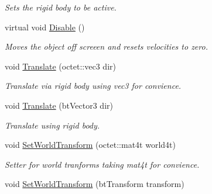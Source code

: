 \begin{DoxyCompactItemize}
\begin{DoxyCompactList}\small\item\em Sets the rigid body to be active. \end{DoxyCompactList}\item 
\hypertarget{class_arena_1_1_physics_object_a2fa9893c955d2332d67108fbaa7f308e}{virtual void \hyperlink{class_arena_1_1_physics_object_a2fa9893c955d2332d67108fbaa7f308e}{Disable} ()}\label{class_arena_1_1_physics_object_a2fa9893c955d2332d67108fbaa7f308e}

\begin{DoxyCompactList}\small\item\em Moves the object off screeen and resets velocities to zero. \end{DoxyCompactList}\item 
\hypertarget{class_arena_1_1_physics_object_a93fc76dcb805562b0a52bfd2cf5875fc}{void \hyperlink{class_arena_1_1_physics_object_a93fc76dcb805562b0a52bfd2cf5875fc}{Translate} (octet\+::vec3 dir)}\label{class_arena_1_1_physics_object_a93fc76dcb805562b0a52bfd2cf5875fc}

\begin{DoxyCompactList}\small\item\em Translate via rigid body using vec3 for convience. \end{DoxyCompactList}\item 
\hypertarget{class_arena_1_1_physics_object_a0f087630aa3ec68b5038c14e65ead3c5}{void \hyperlink{class_arena_1_1_physics_object_a0f087630aa3ec68b5038c14e65ead3c5}{Translate} (bt\+Vector3 dir)}\label{class_arena_1_1_physics_object_a0f087630aa3ec68b5038c14e65ead3c5}

\begin{DoxyCompactList}\small\item\em Translate using rigid body. \end{DoxyCompactList}\item 
\hypertarget{class_arena_1_1_physics_object_ab3f025024f294f67913cd06c2ee0116a}{void \hyperlink{class_arena_1_1_physics_object_ab3f025024f294f67913cd06c2ee0116a}{Set\+World\+Transform} (octet\+::mat4t world4t)}\label{class_arena_1_1_physics_object_ab3f025024f294f67913cd06c2ee0116a}

\begin{DoxyCompactList}\small\item\em Setter for world tranforms taking mat4t for convience. \end{DoxyCompactList}\item 
\hypertarget{class_arena_1_1_physics_object_a69f91c2a392a5ace0af86d69d355f5ee}{void \hyperlink{class_arena_1_1_physics_object_a69f91c2a392a5ace0af86d69d355f5ee}{Set\+World\+Transform} (bt\+Transform transform)}\label{class_arena_1_1_physics_object_a69f91c2a392a5ace0af86d69d355f5ee}


\end{DoxyCompactItemize}
